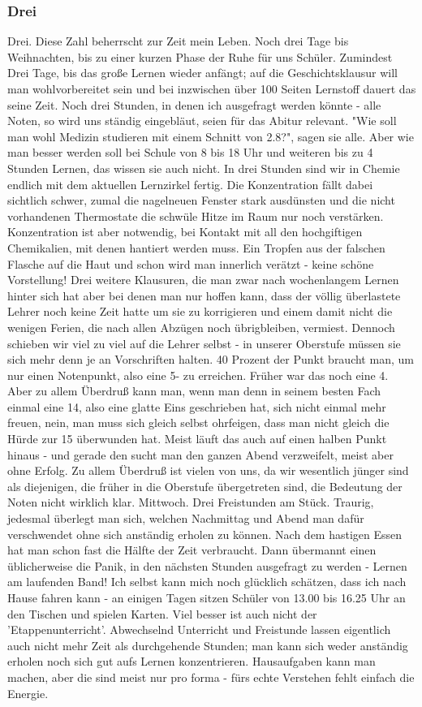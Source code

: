 \documentclass[a4paper,12pt,twoside]{scrbook}
\begin{document}
\subsubsection{Drei}
Drei.
Diese Zahl beherrscht zur Zeit mein Leben.
Noch drei Tage bis Weihnachten, bis zu einer kurzen Phase der Ruhe für uns Schüler. Zumindest Drei Tage, bis das große Lernen wieder anfängt; auf die Geschichtsklausur will man wohlvorbereitet sein und bei inzwischen über 100 Seiten Lernstoff dauert das seine Zeit.
Noch drei Stunden, in denen ich ausgefragt werden könnte - alle Noten, so wird uns ständig eingebläut, seien für das Abitur relevant. "Wie soll man wohl Medizin studieren mit einem Schnitt von 2.8?", sagen sie alle. Aber wie man besser werden soll bei Schule von 8 bis 18 Uhr und weiteren bis zu 4 Stunden Lernen, das wissen sie auch nicht.
In drei Stunden sind wir in Chemie endlich mit dem aktuellen Lernzirkel fertig. Die Konzentration fällt dabei sichtlich schwer, zumal die nagelneuen Fenster stark ausdünsten und die nicht vorhandenen Thermostate die schwüle Hitze im Raum nur noch verstärken. Konzentration ist aber notwendig, bei Kontakt mit all den hochgiftigen Chemikalien, mit denen hantiert werden muss. Ein Tropfen aus der falschen Flasche auf die Haut und schon wird man innerlich verätzt - keine schöne Vorstellung!
Drei weitere Klausuren, die man zwar nach wochenlangem Lernen hinter sich hat aber bei denen man nur hoffen kann, dass der völlig überlastete Lehrer noch keine Zeit hatte um sie zu korrigieren und einem damit nicht die wenigen Ferien, die nach allen Abzügen noch übrigbleiben, vermiest.
Dennoch schieben wir viel zu viel auf die Lehrer selbst - in unserer Oberstufe müssen sie sich mehr denn je an Vorschriften halten. 40 Prozent der Punkt braucht man, um nur einen Notenpunkt, also eine 5- zu erreichen. Früher war das noch eine 4. Aber zu allem Überdruß kann man, wenn man denn in seinem besten Fach einmal eine 14, also eine glatte Eins geschrieben hat, sich nicht einmal mehr freuen, nein, man muss sich gleich selbst ohrfeigen, dass man nicht gleich die Hürde zur 15 überwunden hat. Meist läuft das auch auf einen halben Punkt hinaus - und gerade den sucht man den ganzen Abend verzweifelt, meist aber ohne Erfolg. Zu allem Überdruß ist vielen von uns, da wir wesentlich jünger sind als diejenigen, die früher in die Oberstufe übergetreten sind, die Bedeutung der Noten nicht wirklich klar.
Mittwoch. Drei Freistunden am Stück. Traurig, jedesmal überlegt man sich, welchen Nachmittag und Abend man dafür verschwendet ohne sich anständig erholen zu können. Nach dem hastigen Essen hat man schon fast die Hälfte der Zeit verbraucht. Dann übermannt einen üblicherweise die Panik, in den nächsten Stunden ausgefragt zu werden - Lernen am laufenden Band! Ich selbst kann mich noch glücklich schätzen, dass ich nach Hause fahren kann - an einigen Tagen sitzen Schüler von 13.00 bis 16.25 Uhr an den Tischen und spielen Karten. Viel besser ist auch nicht der 'Etappenunterricht'. Abwechselnd Unterricht und Freistunde lassen eigentlich auch nicht mehr Zeit als durchgehende Stunden; man kann sich weder anständig erholen noch sich gut aufs Lernen konzentrieren. Hausaufgaben kann man machen, aber die sind meist nur pro forma - fürs echte Verstehen fehlt einfach die Energie.
\end{document}
